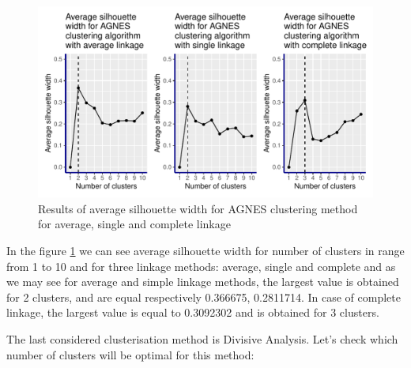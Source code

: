 \documentclass[11pt,a4paper]{article}\usepackage[]{graphicx}\usepackage[]{xcolor}
\makeatletter
\def\maxwidth{ %
  \ifdim\Gin@nat@width>\linewidth
    \linewidth
  \else
    \Gin@nat@width
  \fi
}
\newenvironment{knitrout}{}{} %
\makeatother
\begin{document}
	
\begin{knitrout}
\color{fgcolor}\begin{figure}
\includegraphics[width=\maxwidth]{figure/agnes_silhouette-1} \caption[Results of average silhouette width for AGNES clustering method for average, single and complete linkage]{Results of average silhouette width for AGNES clustering method for average, single and complete linkage}\label{fig:agnes_silhouette}
\end{figure}

\end{knitrout}
	
	In the figure \ref{fig:agnes_silhouette} we can see average silhouette width for number of clusters in range from 1 to 10 and for three linkage methods: average, single and complete and as we may see for average and simple linkage methods, the largest value is obtained for 2 clusters, and are equal respectively 0.366675, 0.2811714. In case of complete linkage, the largest value is equal to 0.3092302 and is obtained for 3 clusters.
	
	The last considered clusterisation method is Divisive Analysis. Let's check which number of clusters will be optimal for this method:
	
\end{document}
